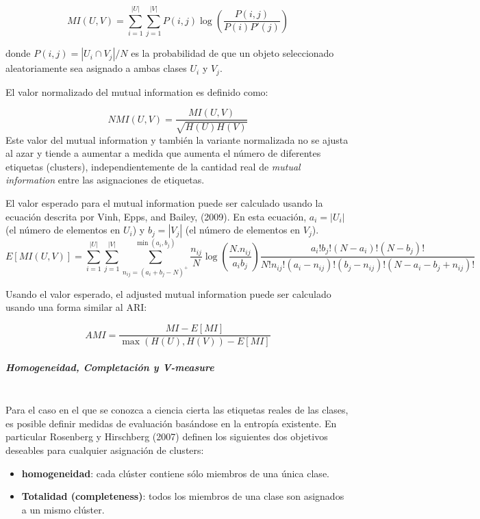 \begin{equation}	
	MI(U, V) = \sum_{i=1}^{|U|}\sum_{j=1}^{|V|}P(i, j)\log(\frac{P(i,j)}{P(i)P'(j)})
\end{equation}

donde $P(i, j) = |U_i \cap V_j| /N$ es la probabilidad de que un objeto seleccionado aleatoriamente sea asignado a ambas clases $U_i$ y $V_j$.

El valor normalizado del mutual information es definido como:

\begin{equation}	
	NMI(U, V) = \frac{MI(U, V)}{\sqrt{H(U)H(V)}}
\end{equation}
Este valor del mutual information y también la variante normalizada no se ajusta al azar y tiende a aumentar a medida que aumenta el número de diferentes etiquetas (clusters), independientemente de la cantidad real de \textit{mutual information} entre las asignaciones de etiquetas.

El valor esperado para el mutual information puede ser calculado usando la ecuación descrita por  Vinh, Epps, and Bailey, (2009). En esta ecuación, $a_i = |U_i|$ (el número de elementos en $U_i$) y $b_j = |V_j|$ (el número de elementos en $V_j$).
\begin{equation}	
	E[MI(U,V)]=\sum_{i=1}^{|U|} \sum_{j=1}^{|V|} \sum_{n_{ij}=(a_i+b_j-N)^+ }^{\min(a_i, b_j)} \frac{n_{ij}}{N}\log ( \frac{ N.n_{ij}}{a_i b_j}) \frac{a_i!b_j!(N-a_i)!(N-b_j)!}{N!n_{ij}!(a_i-n_{ij})!(b_j-n_{ij})! (N-a_i-b_j+n_{ij})!}	
\end{equation}

Usando el valor esperado, el adjusted mutual information puede ser calculado usando una forma similar al ARI:

\begin{equation}	
	AMI = \frac{MI - E[MI]}{\max(H(U), H(V)) - E[MI]}
\end{equation}

\subparagraph{Homogeneidad, Completación y V-measure \\\\}

Para el caso en el que se conozca a ciencia cierta las etiquetas reales de las clases, es posible definir medidas de evaluación basándose en la entropía existente. En particular Rosenberg y Hirschberg (2007) \cite{rosenberg2007v} definen los siguientes dos objetivos deseables para cualquier asignación de clusters:

\begin{itemize}
	
	\item \textbf{homogeneidad}: cada clúster contiene sólo miembros de una única clase.
	
	\item \textbf{Totalidad (completeness)}: todos los miembros de una clase son asignados a un mismo clúster.
	
\end{itemize}

